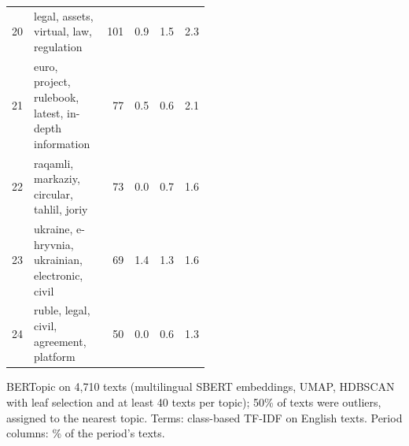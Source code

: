\begin{table}[htbp]
\begin{tabular}{@{}rp{0.5\linewidth}rrrr@{}}
20 & legal, assets, virtual, law, regulation & 101 & 0.9 & 1.5 & 2.3 \\
21 & euro, project, rulebook, latest, in-depth information & 77 & 0.5 & 0.6 & 2.1 \\
22 & raqamli, markaziy, circular, tahlil, joriy & 73 & 0.0 & 0.7 & 1.6 \\
23 & ukraine, e-hryvnia, ukrainian, electronic, civil & 69 & 1.4 & 1.3 & 1.6 \\
24 & ruble, legal, civil, agreement, platform & 50 & 0.0 & 0.6 & 1.3 \\
\bottomrule
\end{tabular}
\par\smallskip\parbox{0.92\linewidth}{\footnotesize BERTopic on 4,710 texts (multilingual SBERT embeddings, UMAP, HDBSCAN with leaf selection and at least 40 texts per topic); 50\% of texts were outliers, assigned to the nearest topic. Terms: class-based TF-IDF on English texts. Period columns: \% of the period's texts.}
\end{table}
